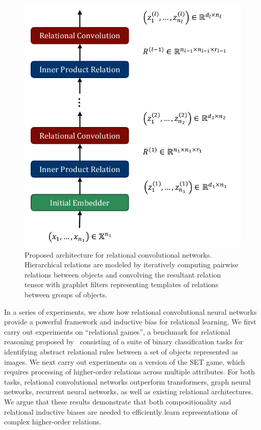 \begin{figure}
    \vskip -20pt
    \centering
    \includegraphics[width=.5\textwidth]{figs/relconv_architecture.pdf}
    \vskip-5pt
    \caption{Proposed architecture for relational convolutional networks. Hierarchical relations are modeled by iteratively computing pairwise relations between objects and convolving the resultant relation tensor with graphlet filters representing templates of relations between groups of objects.
    }\label{fig:relconv_architecture}
\end{figure}

In a series of experiments, we show how relational convolutional neural networks provide a powerful framework and inductive bias for relational learning. We first carry out experiments on ``relational games'', a benchmark for relational reasoning proposed by~\citep{shanahanExplicitlyRelationalNeural} consisting of a suite of binary classification tasks for identifying abstract relational rules between a set of objects represented as images. We next carry out experiments on a version of the SET game, which requires processing of higher-order relations across multiple attributes. For both tasks, relational convolutional networks outperform transformers, graph neural networks, recurrent neural networks, as well as existing relational architectures. We argue that these results demonstrate that both compositionality and relational inductive biases are needed to efficiently learn representations of complex higher-order relations.

